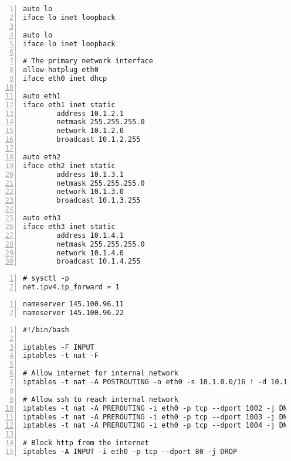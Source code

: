 \documentclass[Configuration]{subfiles}
\begin{document}
\begin{lstlisting}[frame=single,caption=/etc/network/interfaces,backgroundcolor=\color{gray},breaklines=true,numbers=left,]
auto lo
iface lo inet loopback

auto lo
iface lo inet loopback

# The primary network interface
allow-hotplug eth0
iface eth0 inet dhcp

auto eth1
iface eth1 inet static
        address 10.1.2.1
        netmask 255.255.255.0
        network 10.1.2.0
        broadcast 10.1.2.255

auto eth2
iface eth2 inet static
        address 10.1.3.1
        netmask 255.255.255.0
        network 10.1.3.0
        broadcast 10.1.3.255

auto eth3
iface eth3 inet static
        address 10.1.4.1
        netmask 255.255.255.0
        network 10.1.4.0
        broadcast 10.1.4.255
\end{lstlisting}

\begin{lstlisting}[frame=single,caption=/etc/resolv.conf,backgroundcolor=\color{gray},breaklines=true,numbers=left,]
# sysctl -p
net.ipv4.ip_forward = 1
\end{lstlisting}

\begin{lstlisting}[frame=single,caption=/etc/resolv.conf,backgroundcolor=\color{gray},breaklines=true,numbers=left,]
nameserver 145.100.96.11
nameserver 145.100.96.22
\end{lstlisting}

\begin{lstlisting}[frame=single,caption=/etc/network/interfaces,backgroundcolor=\color{gray},breaklines=true,numbers=left,]
#!/bin/bash

iptables -F INPUT
iptables -t nat -F

# Allow internet for internal network
iptables -t nat -A POSTROUTING -o eth0 -s 10.1.0.0/16 ! -d 10.1.0.0/8 -j SNAT --to-source 145.100.104.61

# Allow ssh to reach internal network
iptables -t nat -A PREROUTING -i eth0 -p tcp --dport 1002 -j DNAT --to-destination 10.1.2.2:22
iptables -t nat -A PREROUTING -i eth0 -p tcp --dport 1003 -j DNAT --to-destination 10.1.3.2:22
iptables -t nat -A PREROUTING -i eth0 -p tcp --dport 1004 -j DNAT --to-destination 10.1.4.2:22

# Block http from the internet
iptables -A INPUT -i eth0 -p tcp --dport 80 -j DROP
\end{lstlisting}
\end{document}
